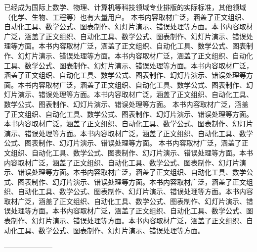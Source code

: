 \documentclass[UTF8]{ctexart}
\begin{document}
已经成为国际上数学、物理、计算机等科技领域专业排版的实际标准，其他领域（化学、生物、工程等）也有大量用户。				本书内容取材广泛，涵盖了正文组织、自动化工具、数学公式、图表制作、幻灯片演示、错误处理等方面。本书内容取材广泛，涵盖了正文组织、自动化工具、数学公式、图表制作、幻灯片演示、错误处理等方面。本书内容取材广泛，涵盖了正文组织、自动化工具、数学公式、图表制作、幻灯片演示、错误处理等方面。本书内容取材广泛，涵盖了正文组织、自动化工具、数学公式、图表制作、幻灯片演示、错误处理等方面。本书内容取材广泛，涵盖了正文组织、自动化工具、数学公式、图表制作、幻灯片演示、错误处理等方面。本书内容取材广泛，涵盖了正文组织、自动化工具、数学公式、图表制作、幻灯片演示、错误处理等方面。本书内容取材广泛，涵盖了正文组织、自动化工具、数学公式、图表制作、幻灯片演示、错误处理等方面。				本书内容取材广泛，涵盖了正文组织、自动化工具、数学公式、图表制作、幻灯片演示、错误处理等方面。本书内容取材广泛，涵盖了正文组织、自动化工具、数学公式、图表制作、幻灯片演示、错误处理等方面。本书内容取材广泛，涵盖了正文组织、自动化工具、数学公式、图表制作、幻灯片演示、错误处理等方面。				本书内容取材广泛，涵盖了正文组织、自动化工具、数学公式、图表制作、幻灯片演示、错误处理等方面。本书内容取材广泛，涵盖了正文组织、自动化工具、数学公式、图表制作、幻灯片演示、错误处理等方面。本书内容取材广泛，涵盖了正文组织、自动化工具、数学公式、图表制作、幻灯片演示、错误处理等方面。本书内容取材广泛，涵盖了正文组织、自动化工具、数学公式、图表制作、幻灯片演示、错误处理等方面。本书内容取材广泛，涵盖了正文组织、自动化工具、数学公式、图表制作、幻灯片演示、错误处理等方面。本书内容取材广泛，涵盖了正文组织、自动化工具、数学公式、图表制作、幻灯片演示、错误处理等方面。本书内容取材广泛，涵盖了正文组织、自动化工具、数学公式、图表制作、幻灯片演示、错误处理等方面。	


---------------------
\end{document}
